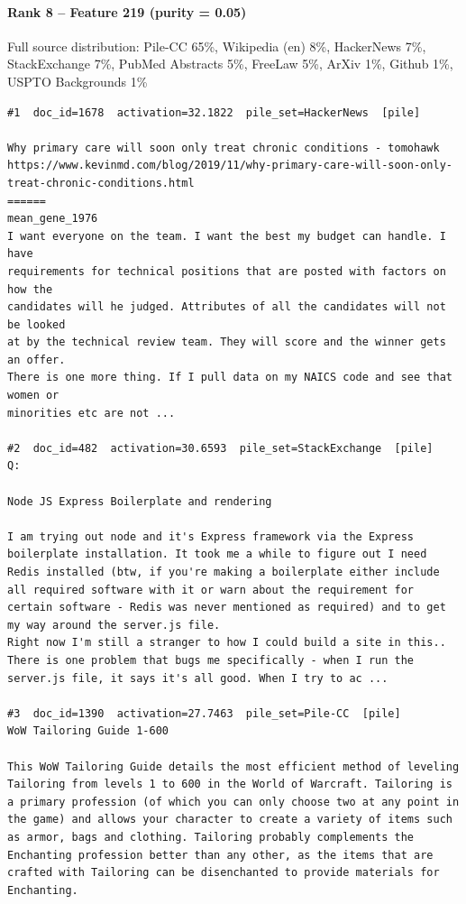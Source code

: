 \paragraph*{Rank 8 -- Feature 219 (purity = 0.05)}

Full source distribution: Pile-CC 65\%, Wikipedia (en) 8\%, HackerNews 7\%, StackExchange 7\%, PubMed Abstracts 5\%, FreeLaw 5\%, ArXiv 1\%, Github 1\%, USPTO Backgrounds 1\%

\begin{verbatim}
#1  doc_id=1678  activation=32.1822  pile_set=HackerNews  [pile]

Why primary care will soon only treat chronic conditions - tomohawk
https://www.kevinmd.com/blog/2019/11/why-primary-care-will-soon-only-treat-chronic-conditions.html
======
mean_gene_1976
I want everyone on the team. I want the best my budget can handle. I have
requirements for technical positions that are posted with factors on how the
candidates will he judged. Attributes of all the candidates will not be looked
at by the technical review team. They will score and the winner gets an offer.
There is one more thing. If I pull data on my NAICS code and see that women or
minorities etc are not ...

#2  doc_id=482  activation=30.6593  pile_set=StackExchange  [pile]
Q:

Node JS Express Boilerplate and rendering

I am trying out node and it's Express framework via the Express boilerplate installation. It took me a while to figure out I need Redis installed (btw, if you're making a boilerplate either include all required software with it or warn about the requirement for certain software - Redis was never mentioned as required) and to get my way around the server.js file.
Right now I'm still a stranger to how I could build a site in this..
There is one problem that bugs me specifically - when I run the server.js file, it says it's all good. When I try to ac ...

#3  doc_id=1390  activation=27.7463  pile_set=Pile-CC  [pile]
WoW Tailoring Guide 1-600

This WoW Tailoring Guide details the most efficient method of leveling Tailoring from levels 1 to 600 in the World of Warcraft. Tailoring is a primary profession (of which you can only choose two at any point in the game) and allows your character to create a variety of items such as armor, bags and clothing. Tailoring probably complements the Enchanting profession better than any other, as the items that are crafted with Tailoring can be disenchanted to provide materials for Enchanting.


\end{verbatim}
